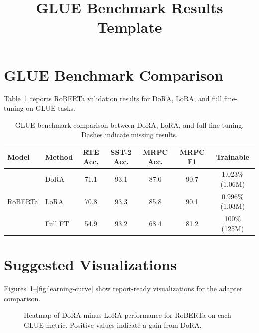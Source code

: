 \documentclass[11pt]{article}
\title{GLUE Benchmark Results Template}
\author{}
\date{}
\begin{document}
\maketitle

\section*{GLUE Benchmark Comparison}

Table~\ref{tab:glue-results} reports RoBERTa validation results for DoRA, LoRA, and full fine-tuning on GLUE tasks.

\begin{table}[h]
\centering
\caption{GLUE benchmark comparison between DoRA, LoRA, and full fine-tuning. Dashes indicate missing results.}
\label{tab:glue-results}
\renewcommand{\arraystretch}{1.2}
\begin{tabular}{llccccc}
\toprule
\textbf{Model} & \textbf{Method} & \textbf{RTE Acc.} & \textbf{SST-2 Acc.} & \textbf{MRPC Acc.} & \textbf{MRPC F1} & \textbf{Trainable} \\
\midrule
\multirow{3}{*}{RoBERTa}
  & DoRA    & 71.1 & 93.1 & 87.0 & 90.7 & 1.023\% (1.06M) \\
  & LoRA    & 70.8 & 93.3 & 85.8 & 90.1 & 0.996\% (1.03M) \\
  & Full FT & 54.9 & 93.2 & 68.4 & 81.2 & 100\% (125M) \\
\bottomrule
\end{tabular}
\end{table}

\section*{Suggested Visualizations}

Figures~\ref{fig:heatmap}--\ref{fig:learning-curve} show report-ready visualizations for the adapter comparison.

\begin{figure}[!t]
\centering
{}
\caption{Heatmap of DoRA minus LoRA performance for RoBERTa on each GLUE metric. Positive values indicate a gain from DoRA.}
\label{fig:heatmap}
\end{figure}
\end{document}
